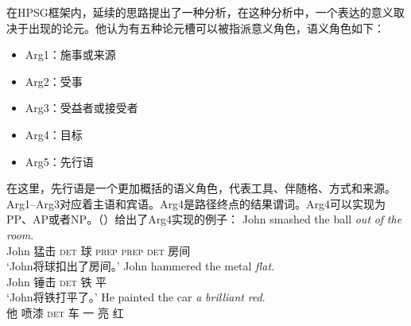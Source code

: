 \begin{exe}
\begin{xlist}[iv.]
\begin{exe}
\begin{xlist}[iv.]
\mbox{}\citet{Haugereid2007a}在HPSG框架内，延续\citet{Borer2005a-u}的思路提出了一种分析，在这种分析中，一个表达的意义取决于出现的论元。他认为有五种论元槽可以被指派意义角色，语义角色如下：
\begin{itemize}
\item Arg1：施事或来源
\item Arg2：受事
\item Arg3：受益者或接受者
\item Arg4：目标
\item Arg5：先行语
\end{itemize}
在这里，先行语是一个更加概括的语义角色，代表工具、伴随格、方式和来源。Arg1--Arg3对应着主语和宾语。Arg4是路径终点的结果谓词。Arg4可以实现为PP、AP或者NP。（）给出了Arg4实现的例子：
\eal
\ex 
\gll John smashed the ball \emph{out} \emph{of} \emph{the} \emph{room}.\\
     John 猛击 \textsc{det} 球 \textsc{prep} \textsc{prep} \textsc{det} 房间\\
\glt `John将球扣出了房间。'
\ex 
\gll John hammered the metal \emph{flat}.\\
     John 锤击 \textsc{det} 铁 平\\
\glt `John将铁打平了。'
\ex 
\gll He painted the car \emph{a} \emph{brilliant} \emph{red}.\\
     他 喷漆 \textsc{det} 车 一 亮 红\\

\end{xlist}
\end{exe}
\end{xlist}
\end{exe}
